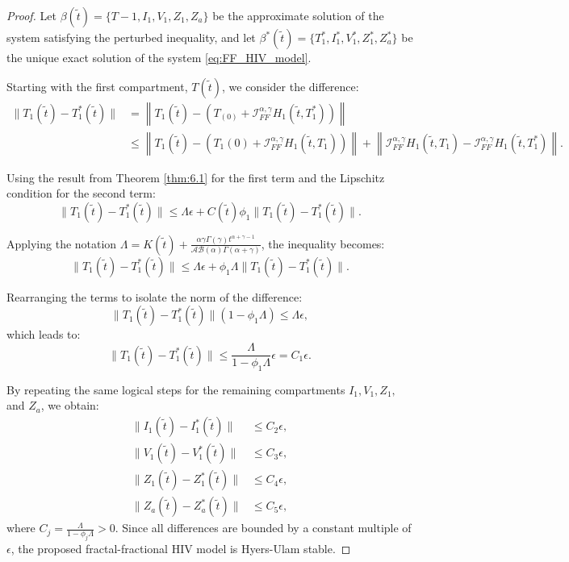 \documentclass[10pt,a4paper]{amsart}
\numberwithin{equation}{section}
\begin{document}
\begin{proof}
	Let $\beta(\tilde{t}) = \{T-1, I_1, V_1, Z_1, Z_a\}$ be the approximate solution of the system satisfying the perturbed inequality, and let $\beta^*(\tilde{t}) = \{T_1^*, I_1^*, V_1^*, Z_1^*, Z_a^*\}$ be the unique exact solution of the system \eqref{eq:FF_HIV_model}.
	
	Starting with the first compartment, $T(\tilde{t})$, we consider the difference:
	\begin{align*}
		\|T_1(\tilde{t}) - T_1^*(\tilde{t})\| &= \left\| T_1(\tilde{t}) - \left( T_(0) + \mathcal{I}_{FF}^{\alpha, \gamma} H_1(\tilde{t}, T_1^*) \right) \right\| \\
		&\leq \left\| T_1(\tilde{t}) - \left( T_1(0) + \mathcal{I}_{FF}^{\alpha, \gamma} H_1(\tilde{t}, T_1) \right) \right\| + \left\| \mathcal{I}_{FF}^{\alpha, \gamma} H_1(\tilde{t}, T_1) - \mathcal{I}_{FF}^{\alpha, \gamma} H_1(\tilde{t}, T_1^*) \right\|.
	\end{align*}
	
	Using the result from Theorem \ref{thm:6.1} for the first term and the Lipschitz condition for the second term:
	\begin{equation*}
		\|T_1(\tilde{t}) - T_1^*(\tilde{t})\| \leq \Lambda \epsilon + C(\tilde{t}) \phi_1 \|T_1(\tilde{t}) - T_1^*(\tilde{t})\|.
	\end{equation*}
	
	Applying the notation $\Lambda = K(\tilde{t}) + \frac{\alpha\gamma \Gamma(\gamma) t^{\alpha+\gamma-1}}{\mathcal{AB(\alpha)}\Gamma(\alpha+\gamma)}$, the inequality becomes:
	\begin{equation*}
		\|T_1(\tilde{t}) - T_1^*(\tilde{t})\| \leq \Lambda \epsilon + \phi_1 \Lambda \|T_1(\tilde{t}) - T_1^*(\tilde{t})\|.
	\end{equation*}
	
	Rearranging the terms to isolate the norm of the difference:
	\begin{equation*}
		\|T_1(\tilde{t}) - T_1^*(\tilde{t})\| (1 - \phi_1 \Lambda) \leq \Lambda \epsilon,
	\end{equation*}
	which leads to:
	\begin{equation}
		\|T_1(\tilde{t}) - T_1^*(\tilde{t})\| \leq \frac{\Lambda}{1 - \phi_1 \Lambda} \epsilon = C_1 \epsilon.
	\end{equation}
	
	By repeating the same logical steps for the remaining compartments $I_1, V_1, Z_1,$ and $Z_a$, we obtain:
	\begin{align*}
		\|I_1(\tilde{t}) - I_1^*(\tilde{t})\| &\leq C_2 \epsilon, \\
		\|V_1(\tilde{t}) - V_1^*(\tilde{t})\| &\leq C_3 \epsilon, \\
		\|Z_1(\tilde{t}) - Z_1^*(\tilde{t})\| &\leq C_4 \epsilon, \\
		\|Z_{a}(\tilde{t}) - Z_a^*(\tilde{t})\| &\leq C_5 \epsilon,
	\end{align*}
	where $C_j = \frac{\Lambda}{1 - \phi_j \Lambda} > 0$. Since all differences are bounded by a constant multiple of $\epsilon$, the proposed fractal-fractional HIV model is Hyers-Ulam stable.
\end{proof}
\end{document}
